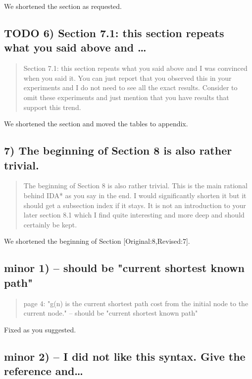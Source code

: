 \documentclass{article}
\begin{document}
We shortened the section as requested.

\subsection{{\bfseries\sffamily TODO} 6) Section 7.1: this section repeats what you said above and \ldots{}}
\label{sec:orgheadline7}

\begin{quote}
Section 7.1: this section repeats what you said above and I was
convinced when you said it. You can just report that you observed this
in your experiments and I do not need to see all the exact results.
Consider to omit these experiments and just mention that you have
results that support this trend.
\end{quote}

We shortened the section and moved the tables to appendix.

\subsection{7) The beginning of Section 8 is also rather trivial.}
\label{sec:orgheadline8}

\begin{quote}
The beginning of Section 8 is also rather trivial. This is the main
rational behind IDA* as you say in the end. I would significantly
shorten it but it should get a subsection index if it stays. It is not
an introduction to your later section 8.1 which I find quite
interesting and more deep and should certainly be kept.
\end{quote}

We shortened the beginning of Section [Original:8,Revised:7].

\subsection{minor 1) -- should be "current shortest known path"}
\label{sec:orgheadline9}

\begin{quote}
page 4: "g(n) is the current shortest path cost from the initial node
to the current node." -- should be "current shortest known path"
\end{quote}

Fixed as you suggested.

\subsection{minor 2) -- I did not like this syntax. Give the reference and\ldots{}}
\label{sec:orgheadline10}
\end{document}
